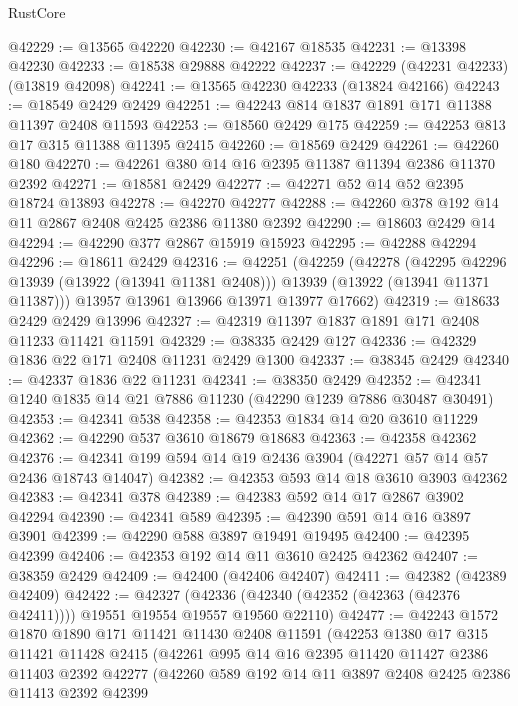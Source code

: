\begin{lexlean}{RustCore}
\begin{coremodule}
@42229 := @13565 @42220
@42230 := @42167 @18535
@42231 := @13398 @42230
@42233 := @18538 @29888 @42222
@42237 := @42229 (@42231 @42233) (@13819 @42098)
@42241 := @13565 @42230 @42233 (@13824 @42166)
@42243 := @18549 @2429 @2429
@42251 := @42243 @814 @1837 @1891 @171 @11388 @11397 @2408 @11593
@42253 := @18560 @2429 @175
@42259 := @42253 @813 @17 @315 @11388 @11395 @2415
@42260 := @18569 @2429
@42261 := @42260 @180
@42270 := @42261 @380 @14 @16 @2395 @11387 @11394 @2386 @11370 @2392
@42271 := @18581 @2429
@42277 := @42271 @52 @14 @52 @2395 @18724 @13893
@42278 := @42270 @42277
@42288 := @42260 @378 @192 @14 @11 @2867 @2408 @2425 @2386 @11380 @2392
@42290 := @18603 @2429 @14
@42294 := @42290 @377 @2867 @15919 @15923
@42295 := @42288 @42294
@42296 := @18611 @2429
@42316 := @42251
    (@42259
      (@42278
        (@42295 @42296 @13939 (@13922 (@13941 @11381 @2408)))
        @13939
        (@13922 (@13941 @11371 @11387)))
      @13957
      @13961
      @13966
      @13971
      @13977
      @17662)
@42319 := @18633 @2429 @2429 @13996
@42327 := @42319 @11397 @1837 @1891 @171 @2408 @11233 @11421 @11591
@42329 := @38335 @2429 @127
@42336 := @42329 @1836 @22 @171 @2408 @11231 @2429 @1300
@42337 := @38345 @2429
@42340 := @42337 @1836 @22 @11231
@42341 := @38350 @2429
@42352 := @42341 @1240 @1835 @14 @21 @7886 @11230 (@42290 @1239 @7886 @30487 @30491)
@42353 := @42341 @538
@42358 := @42353 @1834 @14 @20 @3610 @11229
@42362 := @42290 @537 @3610 @18679 @18683
@42363 := @42358 @42362
@42376 := @42341 @199 @594 @14 @19 @2436 @3904 (@42271 @57 @14 @57 @2436 @18743 @14047)
@42382 := @42353 @593 @14 @18 @3610 @3903 @42362
@42383 := @42341 @378
@42389 := @42383 @592 @14 @17 @2867 @3902 @42294
@42390 := @42341 @589
@42395 := @42390 @591 @14 @16 @3897 @3901
@42399 := @42290 @588 @3897 @19491 @19495
@42400 := @42395 @42399
@42406 := @42353 @192 @14 @11 @3610 @2425 @42362
@42407 := @38359 @2429
@42409 := @42400 (@42406 @42407)
@42411 := @42382 (@42389 @42409)
@42422 := @42327
    (@42336 (@42340 (@42352 (@42363 (@42376 @42411)))) @19551 @19554 @19557 @19560 @22110)
@42477 := @42243
    @1572
    @1870
    @1890
    @171
    @11421
    @11430
    @2408
    @11591
    (@42253
      @1380
      @17
      @315
      @11421
      @11428
      @2415
      (@42261
        @995
        @14
        @16
        @2395
        @11420
        @11427
        @2386
        @11403
        @2392
        @42277
        (@42260
          @589
          @192
          @14
          @11
          @3897
          @2408
          @2425
          @2386
          @11413
          @2392
          @42399

\end{coremodule}
\end{lexlean}
